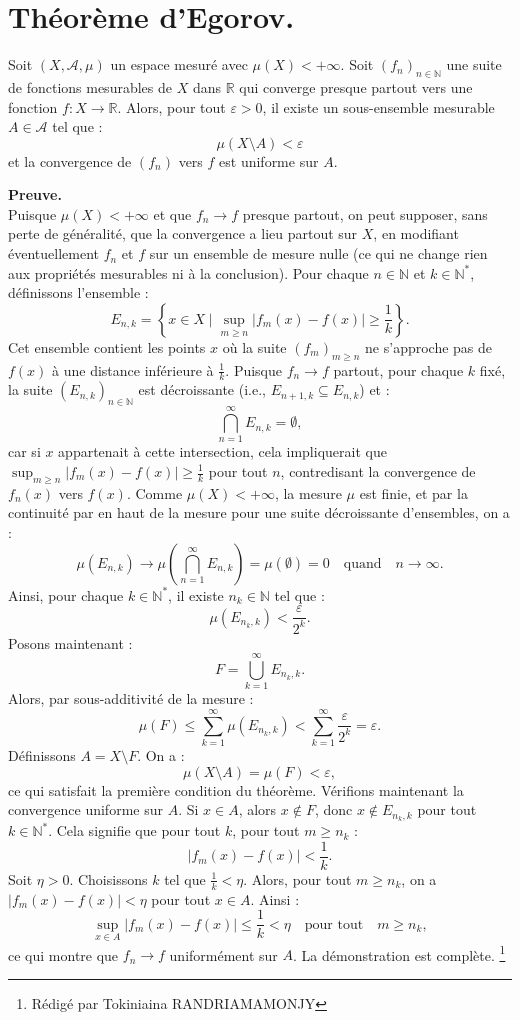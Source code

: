 \documentclass[12pt]{book}
\begin{document}
\section{Théorème d'Egorov.} Soit $(X, \mathcal{A}, \mu)$ un espace mesuré avec $\mu(X) < +\infty$. Soit $(f_n)_{n \in \mathbb{N}}$ une suite de fonctions mesurables de $X$ dans $\mathbb{R}$ qui converge presque partout vers une fonction $f : X \to \mathbb{R}$. Alors, pour tout $\varepsilon > 0$, il existe un sous-ensemble mesurable $A \in \mathcal{A}$ tel que : \[ \mu(X \setminus A) < \varepsilon \] et la convergence de $(f_n)$ vers $f$ est uniforme sur $A$.
\vspace{0.5cm}
\par 
\textbf{Preuve.}\vspace{0.5cm}\\ Puisque $\mu(X) < +\infty$ et que $f_n \to f$ presque partout, on peut supposer, sans perte de généralité, que la convergence a lieu partout sur $X$, en modifiant éventuellement $f_n$ et $f$ sur un ensemble de mesure nulle (ce qui ne change rien aux propriétés mesurables ni à la conclusion). Pour chaque $n \in \mathbb{N}$ et $k \in \mathbb{N}^*$, définissons l'ensemble : \[ E_{n,k} = \left\{ x \in X \mid \sup_{m \geq n} |f_m(x) - f(x)| \geq \frac{1}{k} \right\}. \] Cet ensemble contient les points $x$ où la suite $(f_m)_{m \geq n}$ ne s'approche pas de $f(x)$ à une distance inférieure à $\frac{1}{k}$. Puisque $f_n \to f$ partout, pour chaque $k$ fixé, la suite $(E_{n,k})_{n \in \mathbb{N}}$ est décroissante (i.e., $E_{n+1,k} \subseteq E_{n,k}$) et : \[ \bigcap_{n=1}^\infty E_{n,k} = \emptyset, \] car si $x$ appartenait à cette intersection, cela impliquerait que $\sup_{m \geq n} |f_m(x) - f(x)| \geq \frac{1}{k}$ pour tout $n$, contredisant la convergence de $f_n(x)$ vers $f(x)$. Comme $\mu(X) < +\infty$, la mesure $\mu$ est finie, et par la continuité par en haut de la mesure pour une suite décroissante d'ensembles, on a : \[ \mu(E_{n,k}) \to \mu\left(\bigcap_{n=1}^\infty E_{n,k}\right) = \mu(\emptyset) = 0 \quad \text{quand} \quad n \to \infty. \] Ainsi, pour chaque $k \in \mathbb{N}^*$, il existe $n_k \in \mathbb{N}$ tel que : \[ \mu(E_{n_k,k}) < \frac{\varepsilon}{2^k}. \] Posons maintenant : \[ F = \bigcup_{k=1}^\infty E_{n_k,k}. \] Alors, par sous-additivité de la mesure : \[ \mu(F) \leq \sum_{k=1}^\infty \mu(E_{n_k,k}) < \sum_{k=1}^\infty \frac{\varepsilon}{2^k} = \varepsilon. \] Définissons $A = X \setminus F$. On a : \[ \mu(X \setminus A) = \mu(F) < \varepsilon, \] ce qui satisfait la première condition du théorème. 
Vérifions maintenant la convergence uniforme sur $A$. Si $x \in A$, alors $x \notin F$, donc $x \notin E_{n_k,k}$ pour tout $k \in \mathbb{N}^*$. Cela signifie que pour tout $k$, pour tout $m \geq n_k$ : \[ |f_m(x) - f(x)| < \frac{1}{k}. \] Soit $\eta > 0$. Choisissons $k$ tel que $\frac{1}{k} < \eta$. Alors, pour tout $m \geq n_k$, on a $|f_m(x) - f(x)| < \eta$ pour tout $x \in A$. Ainsi : \[ \sup_{x \in A} |f_m(x) - f(x)| \leq \frac{1}{k} < \eta \quad \text{pour tout} \quad m \geq n_k, \] ce qui montre que $f_n \to f$ uniformément sur $A$. La démonstration est complète.
\clearpage
\footnote{R\'edig\'e par Tokiniaina RANDRIAMAMONJY}
\end{document}
